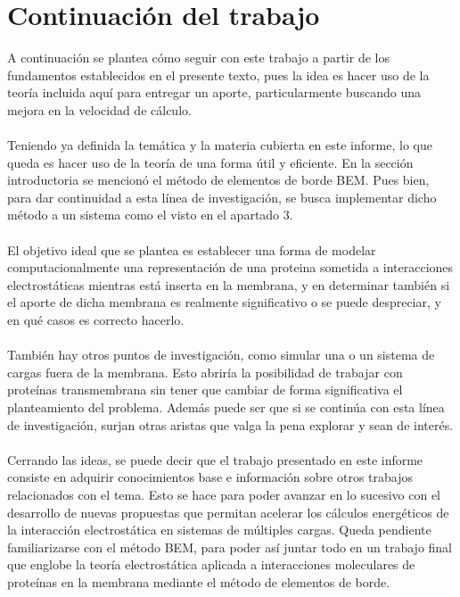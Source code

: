 \documentclass[12pt, oneside, numbers, spanish]{ezthesis}
\numberwithin{equation}{section}
\begin{document}
\section{Continuación del trabajo}
A continuación se plantea cómo seguir con este trabajo a partir de los fundamentos establecidos en el presente texto, pues la idea es hacer uso de la teoría incluida aquí para entregar un aporte, particularmente buscando una mejora en la velocidad de cálculo.\\\\
Teniendo ya definida la temática y la materia cubierta en este informe, lo que queda es hacer uso de la teoría de una forma útil y eficiente. En la sección introductoria se mencionó el método de elementos de borde BEM. Pues bien, para dar continuidad a esta línea de investigación, se busca implementar dicho método a un sistema como el visto en el apartado 3.\\\\
El objetivo ideal que se plantea es establecer una forma de modelar computacionalmente una representación de una proteina sometida a interacciones electrostáticas mientras está inserta en la membrana, y en determinar también si el aporte de dicha membrana es realmente significativo o se puede despreciar, y en qué casos es correcto hacerlo.\\\\
También hay otros puntos de investigación, como simular una o un sistema de cargas fuera de la membrana. Esto abriría la posibilidad de trabajar con proteínas transmembrana sin tener que cambiar de forma significativa el planteamiento del problema. Además puede ser que si se continúa con esta línea de investigación, surjan otras aristas que valga la pena explorar y sean de interés.\\\\
Cerrando las ideas, se puede decir que el trabajo presentado en este informe consiste en adquirir conocimientos base e información sobre otros trabajos relacionados con el tema. Esto se hace para poder avanzar en lo sucesivo con el desarrollo de nuevas propuestas que permitan acelerar los cálculos energéticos de la interacción electrostática en sistemas de múltiples cargas. Queda pendiente familiarizarse con el método BEM, para poder así juntar todo en un trabajo final que englobe la teoría electrostática aplicada a interacciones moleculares de proteínas en la membrana mediante el método de elementos de borde.


\pagebreak
\end{document}

